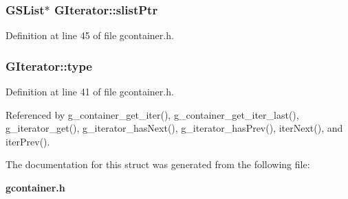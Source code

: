 \subsubsection{\setlength{\rightskip}{0pt plus 5cm}GSList$\ast$ {\bf GIterator::slist\-Ptr}}\label{structGIterator_o3}




Definition at line 45 of file gcontainer.h.
\subsubsection{ {\bf GIterator::type}}\label{structGIterator_o0}




Definition at line 41 of file gcontainer.h.

Referenced by g\_\-container\_\-get\_\-iter(), g\_\-container\_\-get\_\-iter\_\-last(), g\_\-iterator\_\-get(), g\_\-iterator\_\-has\-Next(), g\_\-iterator\_\-has\-Prev(), iter\-Next(), and iter\-Prev().

The documentation for this struct was generated from the following file:\begin{CompactItemize}
\item 
{\bf gcontainer.h}\end{CompactItemize}
